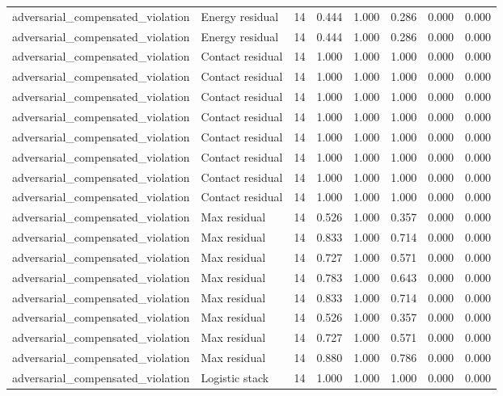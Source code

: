 {\begin{longtable}{llrrrrrr}
adversarial\_compensated\_violation & Energy residual & 14 & 0.444 & 1.000 & 0.286 & 0.000 & 0.000 \\
adversarial\_compensated\_violation & Energy residual & 14 & 0.444 & 1.000 & 0.286 & 0.000 & 0.000 \\
adversarial\_compensated\_violation & Contact residual & 14 & 1.000 & 1.000 & 1.000 & 0.000 & 0.000 \\
adversarial\_compensated\_violation & Contact residual & 14 & 1.000 & 1.000 & 1.000 & 0.000 & 0.000 \\
adversarial\_compensated\_violation & Contact residual & 14 & 1.000 & 1.000 & 1.000 & 0.000 & 0.000 \\
adversarial\_compensated\_violation & Contact residual & 14 & 1.000 & 1.000 & 1.000 & 0.000 & 0.000 \\
adversarial\_compensated\_violation & Contact residual & 14 & 1.000 & 1.000 & 1.000 & 0.000 & 0.000 \\
adversarial\_compensated\_violation & Contact residual & 14 & 1.000 & 1.000 & 1.000 & 0.000 & 0.000 \\
adversarial\_compensated\_violation & Contact residual & 14 & 1.000 & 1.000 & 1.000 & 0.000 & 0.000 \\
adversarial\_compensated\_violation & Contact residual & 14 & 1.000 & 1.000 & 1.000 & 0.000 & 0.000 \\
adversarial\_compensated\_violation & Max residual & 14 & 0.526 & 1.000 & 0.357 & 0.000 & 0.000 \\
adversarial\_compensated\_violation & Max residual & 14 & 0.833 & 1.000 & 0.714 & 0.000 & 0.000 \\
adversarial\_compensated\_violation & Max residual & 14 & 0.727 & 1.000 & 0.571 & 0.000 & 0.000 \\
adversarial\_compensated\_violation & Max residual & 14 & 0.783 & 1.000 & 0.643 & 0.000 & 0.000 \\
adversarial\_compensated\_violation & Max residual & 14 & 0.833 & 1.000 & 0.714 & 0.000 & 0.000 \\
adversarial\_compensated\_violation & Max residual & 14 & 0.526 & 1.000 & 0.357 & 0.000 & 0.000 \\
adversarial\_compensated\_violation & Max residual & 14 & 0.727 & 1.000 & 0.571 & 0.000 & 0.000 \\
adversarial\_compensated\_violation & Max residual & 14 & 0.880 & 1.000 & 0.786 & 0.000 & 0.000 \\
adversarial\_compensated\_violation & Logistic stack & 14 & 1.000 & 1.000 & 1.000 & 0.000 & 0.000 \\

\end{longtable}}
